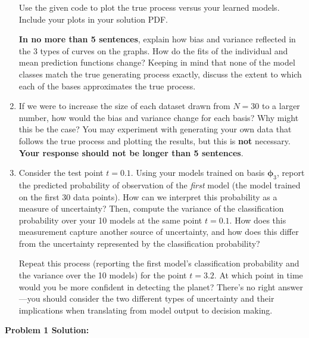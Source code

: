\documentclass[submit]{harvardml}
\begin{document}
\begin{problem}
\begin{enumerate}
Use the given code to plot the true process versus your learned models. Include your plots in your solution PDF.

\textbf{In no more than 5 sentences}, explain how bias and variance reflected in the 3 types of curves on the graphs.  How do the fits of the individual and mean prediction functions change?  Keeping in mind that none of the model classes match the true generating process exactly, discuss the extent to which each of the bases approximates the true process.

\item If we were to increase the size of each dataset drawn from $N = 30$ to a larger number, how would the bias and variance change for each basis? Why might this be the case? You may experiment with generating your own data that follows the true process and plotting the results, but this is \textbf{not} necessary. \textbf{Your response should not be longer than 5 sentences}.

\item Consider the test point $t = 0.1$. Using your models trained on basis $\boldsymbol\phi_3$, report the predicted probability of observation of the \textit{first} model (the model trained on the first 30 data points). How can we interpret this probability as a measure of uncertainty? Then, compute the variance of the classification probability over your 10 models at the same point $t = 0.1$. How does this measurement capture another source of uncertainty, and how does this differ from the uncertainty represented by the classification probability?

Repeat this process (reporting the first model's classification probability and the variance over the 10 models) for the point $t = 3.2$. At which point in time would you be more confident in detecting the planet? There's no right answer---you should consider the two different types of uncertainty and their implications when translating from model output to decision making.

\end{enumerate}
\end{problem}
 \let\cleardoublepage\clearpage
\pagebreak
 \textbf{Problem 1 Solution:}\\
\end{document}
